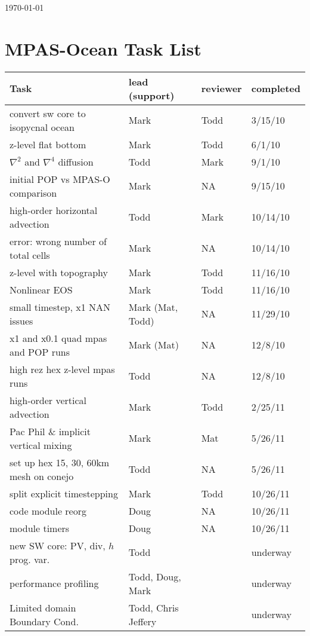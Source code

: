 \documentclass[11pt,titlepage,twoside]{article}
\begin{document}
\today
\section{MPAS-Ocean Task List}

\begin{tabular}{| l || l | l | l |}
\hline		
{\bf Task} \hspace{1.8in} & {\bf lead (support)} & {\bf reviewer } & {\bf completed} \\
\hline		
convert sw core to isopycnal ocean & Mark & Todd & 3/15/10 \\ \hline
z-level flat bottom  & Mark & Todd  & 6/1/10 \\ \hline
$\nabla^2$ and $\nabla^4$ diffusion & Todd & Mark & 9/1/10 \\ \hline
initial POP vs MPAS-O comparison & Mark & NA & 9/15/10 \\ \hline
high-order horizontal advection & Todd &  Mark & 10/14/10 \\ \hline
error: wrong number of total cells & Mark & NA & 10/14/10 \\\hline
z-level with topography  & Mark & Todd  & 11/16/10 \\ \hline
Nonlinear EOS & Mark & Todd  & 11/16/10 \\ \hline
small timestep, x1 NAN issues & Mark (Mat, Todd) & NA  & 11/29/10 \\ \hline
x1 and x0.1 quad mpas and POP runs & Mark (Mat) & NA  & 12/8/10 \\ \hline
high rez hex z-level mpas runs & Todd & NA & 12/8/10 \\ \hline 
high-order vertical advection & Mark & Todd & 2/25/11 \\ \hline
Pac Phil \& implicit vertical mixing & Mark  & Mat & 5/26/11 \\ \hline
set up hex 15, 30, 60km mesh on conejo & Todd & NA & 5/26/11 \\ \hline
split explicit timestepping & Mark & Todd  & 10/26/11 \\ \hline
code module reorg & Doug & NA & 10/26/11  \\ \hline
module timers & Doug & NA & 10/26/11  \\ \hline
\hline
new SW core: PV, div, $h$ prog. var. & Todd &  & underway \\ \hline
performance profiling & Todd, Doug, Mark & & underway \\ \hline 
Limited domain Boundary Cond. & Todd, Chris Jeffery & & underway \\ \hline

\end{tabular}
\end{document}
